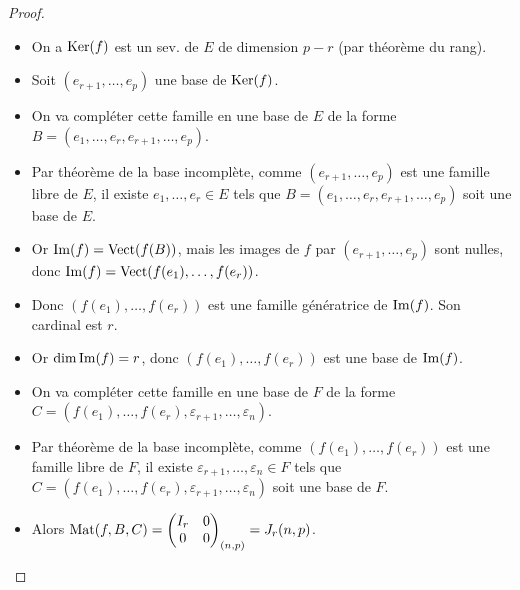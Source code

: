 \documentclass[12pt, a4paper]{report}
\begin{document}
\begin{proof}
    \begin{itemize}
        \item On a $\mathrm{Ker}(f)$ est un sev. de $E$ de dimension $p-r$ (par théorème du rang).

        \item Soit $(e_{r+1}, \dots, e_p)$ une base de $\mathrm{Ker}(f)$.

        \item On va compléter cette famille en une base de $E$ de la forme $B = (e_1, \dots, e_r, e_{r+1}, \dots, e_p)$.

        \item Par théorème de la base incomplète, comme $(e_{r+1}, \dots, e_p)$ est une famille libre de $E$, il existe $e_1, \dots, e_r \in E$ tels que $B = (e_1, \dots, e_r, e_{r+1}, \dots, e_p)$ soit une base de $E$.
        
        \item Or $\mathrm{Im}(f) = \mathrm{Vect}(f(B))$, mais les images de $f$ par $(e_{r+1}, \dots, e_p)$ sont nulles, donc $\mathrm{Im}(f) = \mathrm{Vect}(f(e_1), \dots, f(e_r))$.
        \item Donc $(f(e_1), \dots, f(e_r))$ est une famille génératrice de $\mathrm{Im}(f)$. Son cardinal est $r$.
        \item Or $\dim \mathrm{Im}(f) = r$, donc $(f(e_1), \dots, f(e_r))$ est une base de $\mathrm{Im}(f)$.
        \item On va compléter cette famille en une base de $F$ de la forme $C = (f(e_1), \dots, f(e_r), \varepsilon_{r+1}, \dots, \varepsilon_n)$.
        \item Par théorème de la base incomplète, comme $(f(e_1), \dots, f(e_r))$ est une famille libre de $F$, il existe $\varepsilon_{r+1}, \dots, \varepsilon_n \in F$ tels que $C = (f(e_1), \dots, f(e_r), \varepsilon_{r+1}, \dots, \varepsilon_n)$ soit une base de $F$.
        \item Alors $\mathrm{Mat}(f,B,C) = \left(\begin{matrix} I_r & 0 \\ 0 & 0 \end{matrix}\right)_{(n,p)} = J_r(n,p)$.
        

\end{itemize}
\end{proof}
\end{document}
